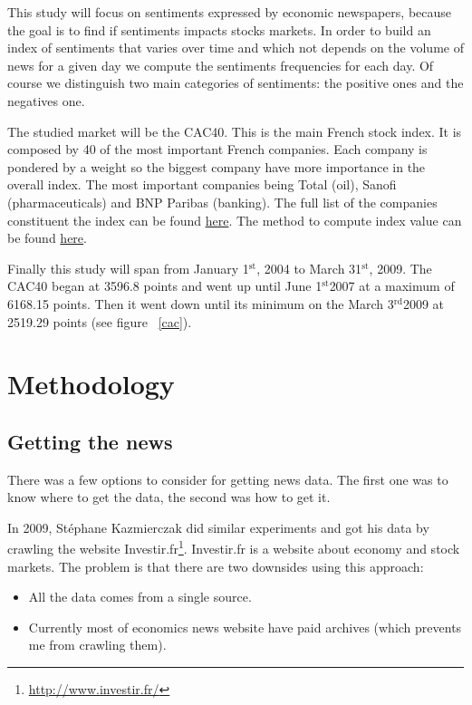 \documentclass[12pt]{report}
\newcommand{\superscript}[1]{\ensuremath{^{\textrm{#1}}}}
\newcommand{\st}[0]{\superscript{st}}
\newcommand{\rd}[0]{\superscript{rd}}
\begin{document}
This study will focus on sentiments expressed by economic newspapers, because the goal is to find if sentiments impacts stocks markets. In order to build an index of sentiments that varies over time and which not depends on the volume of news for a given day we compute the sentiments frequencies for each day. Of course we distinguish two main categories of sentiments: the positive ones and the negatives one.

The studied market will be the CAC40. This is the main French stock index. It is composed by 40 of the most important French companies. Each company is pondered by a weight so the biggest company have more importance in the overall index. The most important companies being Total (oil), Sanofi (pharmaceuticals) and BNP Paribas (banking). The full list of the companies constituent the index can be found \href{http://en.wikipedia.org/wiki/CAC40}{here}. The method to compute index value can be found \href{http://www.euronext.com/fic/000/050/871/508718.pdf}{here}.

Finally this study will span from January 1\st, 2004 to March 31\st, 2009. The CAC40 began at 3596.8 points and went up until June 1\st 2007 at a maximum of 6168.15 points. Then it went down until its minimum on the March 3\rd 2009 at 2519.29 points (see figure ~\ref{cac}).

\chapter{Methodology}
\section{Getting the news}

There was a few options to consider for getting news data. The first one was to know where to get the data, the second was how to get it.

In 2009, Stéphane Kazmierczak \cite{kazmierczak08} did similar experiments and got his data by crawling the website Investir.fr\footnote{\url{http://www.investir.fr/}}. Investir.fr is a website about economy and stock markets. The problem is that there are two downsides using this approach:
\begin{itemize}
	\item All the data comes from a single source.
	\item Currently most of economics news website have paid archives (which prevents me from crawling them).
\end{itemize}
\end{document}
